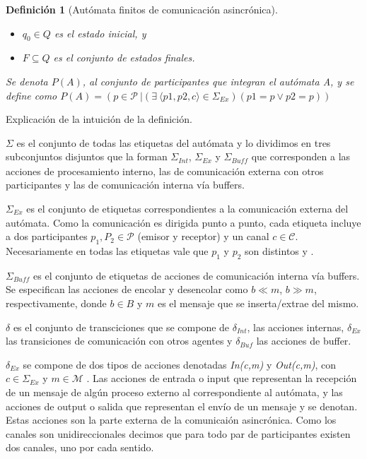 \documentclass[paper=a4, fontsize=11pt, spanish]{scrartcl} %
\numberwithin{equation}{section} %
\numberwithin{figure}{section} %
\numberwithin{table}{section} %
\newtheorem{definition}{Definición}
\begin{document}
\begin{definition}[Autómata finitos de comunicación asincrónica]
\begin{itemize}
\item $q_0 \in Q$ es el estado inicial, y
\item $F \subseteq Q$ es el conjunto de estados finales. 
\end{itemize}

Se denota $P(A)$, al conjunto de participantes que integran el autómata A, y se define como $P(A) = \left(p \in \mathcal{P} \ | \left(\exists\ \langle p1,p2,c\rangle \in \Sigma_\mathit{Ex}\right)\left(p1=p \lor p2=p\right) \right) $ 
\end{definition}


Explicación de la intuición de la definición.

$\Sigma$ es el conjunto de todas las etiquetas del autómata y lo dividimos en tres subconjuntos disjuntos que la forman $\Sigma_{\mathit{Int}}$, $\Sigma_{\mathit{Ex}}$ y $\Sigma_{\mathit{Buff}}$ que corresponden a las acciones de procesamiento interno, las de comunicación externa con otros participantes y las de comunicación interna vía buffers.

$\Sigma_{Ex}$ es el conjunto de etiquetas correspondientes a la comunicación externa del autómata. Como la comunicación es dirigida punto a punto, cada etiqueta incluye a dos participantes $p_1, P_2 \in \mathcal{P}$ (emisor y receptor) y un canal $c \in \mathcal{C}$. Necesariamente en todas las etiquetas vale que $p_1$ y $p_2$ son distintos y .

$\Sigma_{Buff}$ es el conjunto de etiquetas de acciones de comunicación interna vía buffers. Se especifican las acciones de encolar y desencolar como $b \ll m$, $b \gg m$, respectivamente, donde $b \in B$ y $m$ es el mensaje que se inserta/extrae del mismo.

$\delta$ es el conjunto de transciciones que se compone de $\delta_{Int}$, las acciones internas, $\delta_{Ex}$ las transiciones de comunicación con otros agentes y $\delta_{Buf}$ las acciones de buffer.

$\delta_{Ex}$ se compone de dos tipos de acciones denotadas \textit{In(c,m)} y \textit{Out(c,m)}, con $c \in \Sigma_{Ex}$ y $m \in \mathcal{M}$ . Las acciones de entrada o input que representan la recepción de un mensaje de algún proceso externo al correspondiente al autómata,  y las acciones de output o salida que representan el envío de un mensaje y se denotan. Estas acciones son la parte externa de la comunicaión asincrónica. Como los canales son unidireccionales decimos que para todo par de participantes existen dos canales, uno por cada sentido.
\end{document}
